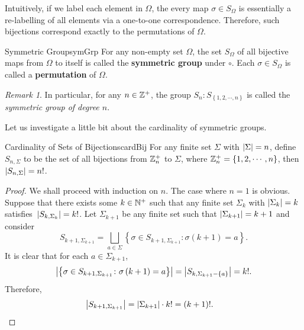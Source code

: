 \documentclass[math]{amznotes}
\theoremstyle{remark}
\newtheorem*{remark}{Remark}
\newcommand{\0}{\mathbf{0}}
\newcommand{\1}{\mathbf{1}}
\begin{document}
Intuitively, if we label each element in $\Omega$, the every map $\sigma \in S_{\Omega}$ is essentially a re-labelling of all elements via a one-to-one correspondence. Therefore, such bijections correspond exactly to the permutations of $\Omega$.
\begin{dfnbox}{Symmetric Group}{symGrp}
    For any non-empty set $\Omega$, the set $S_{\Omega}$ of all bijective maps from $\Omega$ to itself is called the {\color{red} \textbf{symmetric group}} under $\circ$. Each $\sigma \in S_{\Omega}$ is called a {\color{red} \textbf{permutation}} of $\Omega$.
\end{dfnbox}
\begin{notebox}
    \begin{remark}
        In particular, for any $n \in \mathbb{Z}^+$, the group $S_n \colon S_{\left\{1, 2, \cdots, n\right\}}$ is called the \textit{symmetric group of degree $n$}.
    \end{remark}
\end{notebox}
Let us investigate a little bit about the cardinality of symmetric groups.
\begin{probox}{Cardinality of Sets of Bijections}{cardBij}
    For any finite set $\Sigma$ with ${\left\lvert {\Sigma} \right\rvert} = n$, define $S_{n, \Sigma}$ to be the set of all bijections from $\mathbb{Z}_{n}^+$ to $\Sigma$, where $\mathbb{Z}_{n}^+ = \left\{1, 2, \cdots, n\right\}$, then ${\left\lvert {S_{n, \Sigma}} \right\rvert} = n!$.
    \tcblower
    \begin{proof}
        We shall proceed with induction on $n$. The case where $n = 1$ is obvious. Suppose that there exists some $k \in \mathbb{N}^+$ such that any finite set $\Sigma_k$ with ${\left\lvert {\Sigma_k} \right\rvert} = k$ satisfies~${\left\lvert {S_{k, \Sigma_k}} \right\rvert} = k!$. Let $\Sigma_{k + 1}$ be any finite set such that ${\left\lvert {\Sigma_{k + 1}} \right\rvert} = k + 1$ and consider 
        \begin{equation*}
            S_{k + 1, \Sigma_{k + 1}} = \bigsqcup_{a \in \Sigma}\left\{\sigma \in S_{k + 1, \Sigma_{k + 1}} \colon \sigma\left(k + 1\right) = a\right\}.
        \end{equation*}
        It is clear that for each $a \in \Sigma_{k + 1}$, 
        \begin{equation*}
            {\left\lvert {\left\{\sigma \in S_{k + 1, \Sigma_{k + 1}} \colon \sigma\left(k + 1\right) = a\right\}} \right\rvert} = {\left\lvert {S_{k, \Sigma_{k + 1} - \left\{a\right\}}} \right\rvert} = k!.
        \end{equation*}
        Therefore, 
        \begin{align*}
            {\left\lvert {S_{k + 1, \Sigma_{k + 1}}} \right\rvert} & = {\left\lvert {\Sigma_{k + 1}} \right\rvert} \cdot k! = \left(k + 1\right)!.
        \end{align*}
    \end{proof}
\end{probox}
\end{document}
